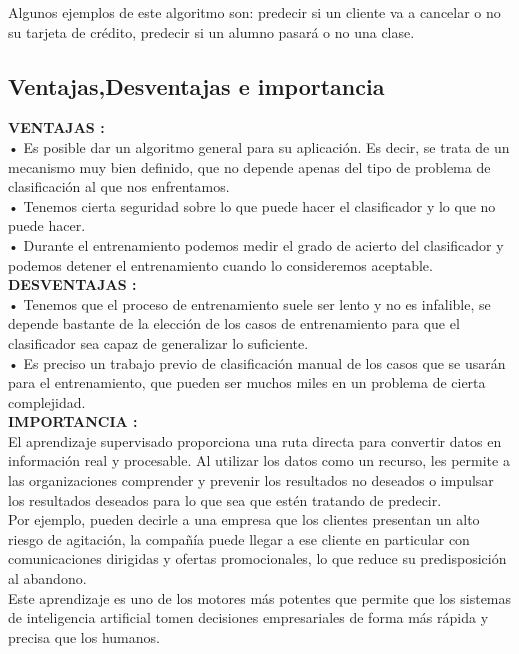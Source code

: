 \documentclass[%
 reprint,
 amsmath,amssymb,
 aps,
]{revtex4-1}
\begin{document}
{Algunos ejemplos de este algoritmo son: predecir si un cliente va a cancelar o no su tarjeta de crédito, predecir si un alumno pasará o no una clase.
\subsection{Ventajas,Desventajas e importancia}

  \textbf{VENTAJAS :}\\ • Es posible dar un algoritmo general para su aplicación. Es decir, se trata de un mecanismo muy bien definido, que no depende apenas del tipo de problema de clasificación al que nos enfrentamos. \\
  • Tenemos cierta seguridad sobre lo que puede hacer el clasificador y lo que no puede hacer.\\ • Durante el entrenamiento podemos medir el grado de acierto del clasificador y podemos detener el entrenamiento cuando lo consideremos aceptable.\\
  
    \textbf{DESVENTAJAS :} \\• Tenemos que el proceso de entrenamiento suele ser lento y no es infalible, se depende bastante de la elección de los casos de entrenamiento para que el clasificador sea capaz de generalizar lo suficiente.\\ • Es preciso un trabajo previo de clasificación manual de los casos que se usarán para el entrenamiento, que pueden ser muchos miles en un problema de cierta complejidad.\\
    
    \textbf{IMPORTANCIA :} \\
    El aprendizaje supervisado proporciona una ruta directa para convertir datos en información real y procesable. Al utilizar los datos como un recurso, les permite a las organizaciones comprender y prevenir los resultados no deseados o impulsar los resultados deseados para lo que sea que estén tratando de predecir.\\
    Por ejemplo, pueden decirle a una empresa que los clientes presentan un alto riesgo de agitación, la compañía puede llegar a ese cliente en particular con comunicaciones dirigidas y ofertas promocionales, lo que reduce su predisposición al abandono.\\
    Este aprendizaje es uno de los motores más potentes que permite que los sistemas de inteligencia artificial tomen decisiones empresariales de forma más rápida y precisa que los humanos.

}
\end{document}
